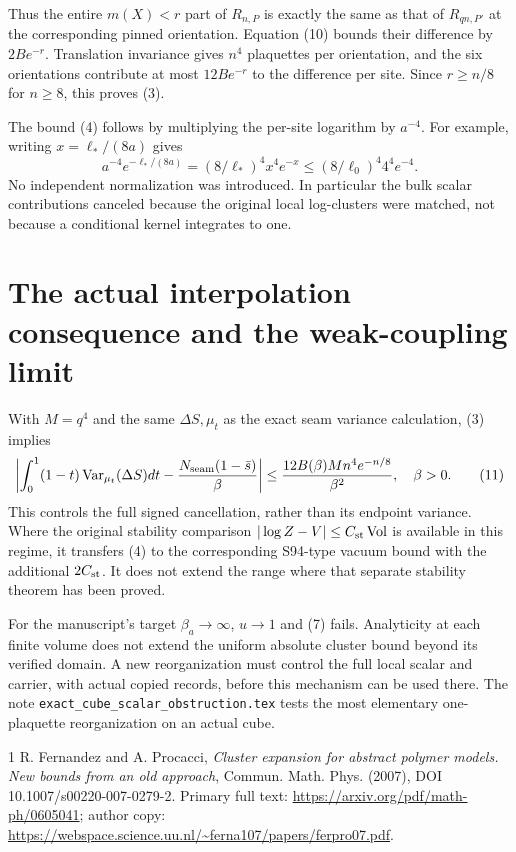 \documentclass{article}
\begin{document}
Thus the entire $m(X)<r$ part of $R_{n,P}$ is exactly the same as that of $R_{qn,P'}$ at the corresponding pinned orientation. Equation (10) bounds their difference by $2Be^{-r}$. Translation invariance gives $n^4$ plaquettes per orientation, and the six orientations contribute at most $12Be^{-r}$ to the difference per site. Since $r\geq n/8$ for $n\geq8$, this proves (3).

The bound (4) follows by multiplying the per-site logarithm by $a^{-4}$. For example, writing $x=\ell_*/(8a)$ gives
\[
 a^{-4}e^{-\ell_*/(8a)}=(8/\ell_*)^4x^4e^{-x}
 \leq (8/\ell_0)^4 4^4e^{-4}.
\]
No independent normalization was introduced. In particular the bulk scalar contributions canceled because the original local log-clusters were matched, not because a conditional kernel integrates to one.

\section{The actual interpolation consequence and the weak-coupling limit}
With $M=q^4$ and the same $\Delta S,\mu_t$ as the exact seam variance calculation, (3) implies
\[
 \left|\int_0^1(1-t)\operatorname{Var}_{\mu_t}(\Delta S)dt
 -\frac{N_{\rm seam}(1-\bar s)}{\beta}\right|
 \leq\frac{12B(\beta)Mn^4e^{-n/8}}{\beta^2},\quad\beta>0.
 \tag{11}
\]
This controls the full signed cancellation, rather than its endpoint variance. Where the original stability comparison $|\log Z-V|\leq C_{\rm st}\operatorname{Vol}$ is available in this regime, it transfers (4) to the corresponding S94-type vacuum bound with the additional $2C_{\rm st}$. It does not extend the range where that separate stability theorem has been proved.

For the manuscript's target $\beta_a\to\infty$, $u\to1$ and (7) fails. Analyticity at each finite volume does not extend the uniform absolute cluster bound beyond its verified domain. A new reorganization must control the full local scalar and carrier, with actual copied records, before this mechanism can be used there. The note \texttt{exact\_cube\_scalar\_obstruction.tex} tests the most elementary one-plaquette reorganization on an actual cube.

\begin{thebibliography}{1}
 R. Fernandez and A. Procacci, \emph{Cluster expansion for abstract polymer models. New bounds from an old approach}, Commun. Math. Phys. (2007), DOI 10.1007/s00220-007-0279-2. Primary full text: \url{https://arxiv.org/pdf/math-ph/0605041}; author copy: \url{https://webspace.science.uu.nl/~ferna107/papers/ferpro07.pdf}.
\end{thebibliography}
\end{document}
